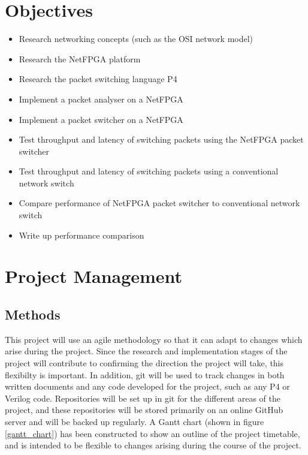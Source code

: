 \documentclass[12pt, a4paper, twoside, onecolumn]{article}
\begin{document}
\section{Objectives}
\label{objectives}

\begin{itemize}
  \item Research networking concepts (such as the OSI network model)
  \item Research the NetFPGA platform \cite{NetFPGA}
  \item Research the packet switching language P4 \cite{P4}
  \item Implement a packet analyser on a NetFPGA
  \item Implement a packet switcher on a NetFPGA
  \item Test throughput and latency of switching packets using the NetFPGA packet switcher
  \item Test throughput and latency of switching packets using a conventional network switch
  \item Compare performance of NetFPGA packet switcher to conventional network switch
  \item Write up performance comparison
\end{itemize}

\section{Project Management}
\label{project_management}

\subsection{Methods}
\label{methods}
This project will use an agile methodology so that it can adapt to changes which arise during the project. Since the research and implementation stages of the project will contribute to confirming the direction the project will take, this flexibilty is important. In addition, git \cite{git} will be used to track changes in both written documents and any code developed for the project, such as any P4 or Verilog code. Repositories will be set up in git for the different areas of the project, and these repositories will be stored primarily on an online GitHub \cite{github} server and will be backed up regularly. A Gantt chart (shown in figure \ref{gantt_chart}) has been constructed to show an outline of the project timetable, and is intended to be flexible to changes arising during the course of the project.
\end{document}
